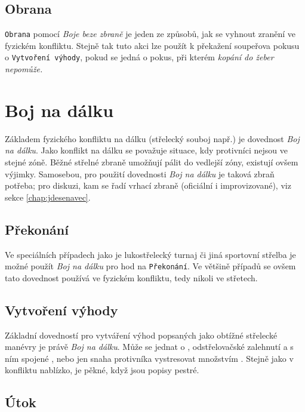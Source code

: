 \documentclass[../main.tex]{subfiles}
\begin{document}
\subsection*{Obrana}
\label{subsec:boj-obrana}
\obrana

\texttt{Obrana} pomocí \textit{Boje beze zbraně} je jeden ze způsobů, jak se vyhnout zranění ve fyzickém konfliktu. Stejně tak tuto akci lze použít k překažení soupeřova pokusu o \texttt{Vytvoření výhody}, pokud se jedná o pokus, při kterém \textit{kopání do žeber nepomůže.}

\section{Boj na dálku}
\label{sec:bojnadalku}

Základem fyzického konfliktu na dálku (střelecký souboj např.) je dovednost \textit{Boj na dálku}. Jako konflikt na dálku se považuje situace, kdy protivníci nejsou ve stejné zóně. Běžné střelné zbraně umožňují pálit do vedlejší zóny, existují ovšem výjimky. Samosebou, pro použití dovednosti \textit{Boj na dálku} je taková zbraň potřeba; pro diskuzi, kam se řadí vrhací zbraně (oficiální i improvizované), viz sekce \ref{chap:jdesenavec}.

\subsection*{Překonání}
\label{subsec:dboj-prekonani}
\prekonani

Ve speciálních případech jako je lukostřelecký turnaj či jiná sportovní střelba je možné použít \textit{Boj na dálku} pro hod na \texttt{Překonání}. Ve většině případů se ovšem tato dovednost používá ve fyzickém konfliktu, tedy nikoli ve střetech.

\subsection*{Vytvoření výhody}
\label{subsec:dboj-vytvoreni}
\vytvoreni

Základní dovedností pro vytváření výhod popsaných jako obtížné střelecké manévry je právě \textit{Boj na dálku}. Může se jednat o , odstřelovačské zalehnutí a s ním spojené , nebo jen snaha protivníka vystresovat množstvím . Stejně jako v konfliktu nablízko, je pěkné, když jsou popisy pestré.

\subsection*{Útok}
\label{subsec:dboj-utok}
\utok
\end{document}
